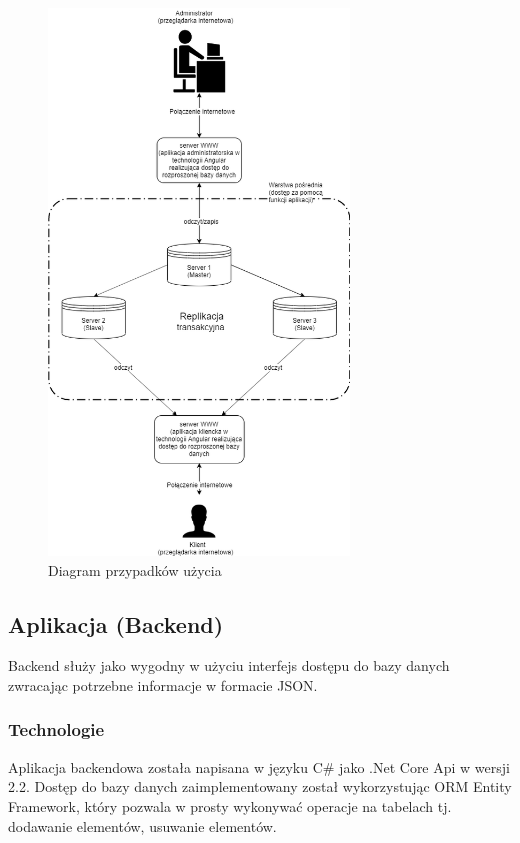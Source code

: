 \documentclass{article}
\begin{document}
			\begin{figure}[hbt!]
				\includegraphics[width=8cm]{Files/Pictures/SystemStruct}
				\centering
				\caption{Diagram przypadków użycia}
			\end{figure}
			\newpage
	\subsection{Aplikacja (Backend)}
	Backend służy jako wygodny w użyciu interfejs dostępu do bazy danych zwracając potrzebne informacje w formacie JSON.
		\subsubsection{Technologie}
		Aplikacja backendowa została napisana w języku C\# jako .Net Core Api w wersji 2.2. Dostęp do bazy danych zaimplementowany został wykorzystując ORM Entity Framework, który pozwala w prosty wykonywać operacje na tabelach tj. dodawanie elementów, usuwanie elementów.
\end{document}
